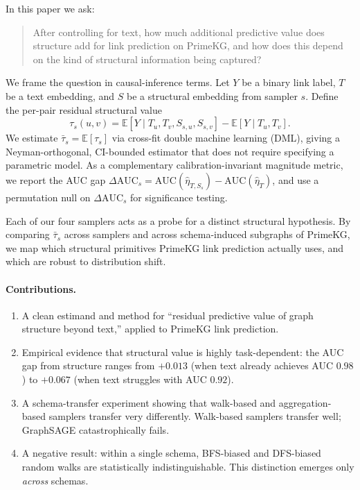 \documentclass[11pt]{article}
\begin{document}
In this paper we ask:

\begin{quote}
After controlling for text, how much additional predictive value does structure add for link prediction on PrimeKG, and how does this depend on the kind of structural information being captured?
\end{quote}

We frame the question in causal-inference terms. Let $Y$ be a binary link label, $T$ be a text embedding, and $S$ be a structural embedding from sampler $s$. Define the per-pair residual structural value
\begin{equation}
\tau_s(u,v) = \mathbb{E}[Y \mid T_u, T_v, S_{s,u}, S_{s,v}] - \mathbb{E}[Y \mid T_u, T_v].
\end{equation}
We estimate $\bar\tau_s = \mathbb{E}[\tau_s]$ via cross-fit double machine learning (DML), giving a Neyman-orthogonal, CI-bounded estimator that does not require specifying a parametric model. As a complementary calibration-invariant magnitude metric, we report the AUC gap $\Delta\mathrm{AUC}_s = \mathrm{AUC}(\hat\eta_{T,S_s}) - \mathrm{AUC}(\hat\eta_T)$, and use a permutation null on $\Delta\mathrm{AUC}_s$ for significance testing.

Each of our four samplers acts as a probe for a distinct structural hypothesis. By comparing $\bar\tau_s$ across samplers and across schema-induced subgraphs of PrimeKG, we map which structural primitives PrimeKG link prediction actually uses, and which are robust to distribution shift.

\paragraph{Contributions.}
\begin{enumerate}
\item A clean estimand and method for ``residual predictive value of graph structure beyond text,'' applied to PrimeKG link prediction.
\item Empirical evidence that structural value is highly task-dependent: the AUC gap from structure ranges from $+0.013$ (when text already achieves AUC $0.98$) to $+0.067$ (when text struggles with AUC $0.92$).
\item A schema-transfer experiment showing that walk-based and aggregation-based samplers transfer very differently. Walk-based samplers transfer well; GraphSAGE catastrophically fails.
\item A negative result: within a single schema, BFS-biased and DFS-biased random walks are statistically indistinguishable. This distinction emerges only \emph{across} schemas.
\end{enumerate}
\end{document}
